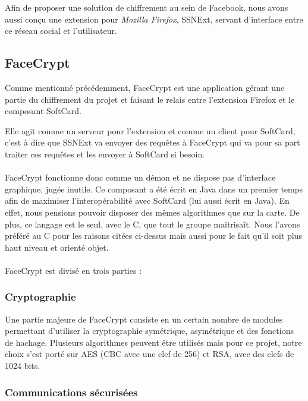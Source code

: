 \documentclass[a4paper,11pt,french]{article}
\begin{document}
Afin de proposer une solution de chiffrement au sein de Facebook, nous avons 
aussi conçu une extension pour \emph{Mozilla Firefox}, SSNExt, servant 
d'interface entre ce réseau social et l'utilisateur.

\subsection{FaceCrypt}
Comme mentionné précédemment, FaceCrypt est une application gérant une partie du
chiffrement du projet et faisant le relais entre l'extension Firefox et le 
composant SoftCard. 

Elle agit comme un serveur pour l'extension et comme un client pour SoftCard, 
c'est à dire que SSNExt va envoyer des requêtes à FaceCrypt qui va pour 
sa part traiter ces requêtes et les envoyer à SoftCard si besoin.

\paragraph{}
FaceCrypt fonctionne donc comme un démon et ne dispose pas d'interface
graphique, jugée inutile. Ce composant a été écrit en Java dans un premier 
temps afin de maximiser l'interopérabilité avec SoftCard (lui aussi écrit en 
Java). En effet, nous pensions pouvoir disposer des mêmes algorithmes 
que sur la carte. De plus, ce langage est le seul, avec le C, que tout le
groupe maitrisaît. Nous l'avons préféré au C pour les raisons citées ci-dessus
mais aussi pour le fait qu'il soit plus haut niveau et orienté objet.

\paragraph{}
FaceCrypt est divisé en trois parties : 

\subsubsection{Cryptographie}
Une partie majeure de FaceCrypt consiste en un certain nombre de modules 
permettant d'utiliser la cryptographie symétrique, asymétrique et des 
fonctions de hachage. Plusieurs algorithmes peuvent être utilisés mais
pour ce projet, notre choix s'est porté sur AES (CBC avec une clef de 256) et 
RSA, avec des clefs de 1024 bits.


\subsubsection{Communications sécurisées} %
\end{document}
